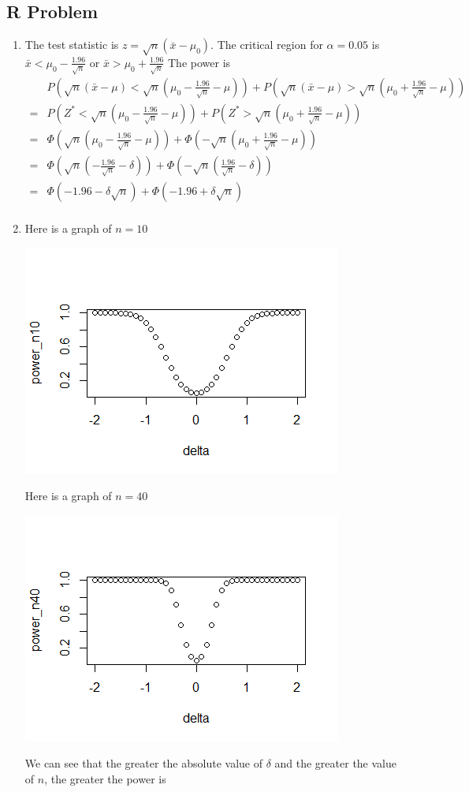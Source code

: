 \documentclass{article}
\begin{document}
\subsection*{R Problem}
\begin{enumerate}
	\item The test statistic is $z = \sqrt{n}(\bar{x} - \mu_0)$.
	The critical region for $\alpha = 0.05$ is 
	$\bar{x} < \mu_0-\frac{1.96}{\sqrt{n}}$ or $\bar{x} > \mu_0+\frac{1.96}{\sqrt{n}}$
	The power is 
	\begin{align*}
		 & P(\sqrt{n}(\bar{x} - \mu) < \sqrt{n}(\mu_0-\frac{1.96}{\sqrt{n}} - \mu)) + P(\sqrt{n}(\bar{x} - \mu) > \sqrt{n}(\mu_0+\frac{1.96}{\sqrt{n}}-\mu)) \\
		=& P(Z^* < \sqrt{n}(\mu_0-\frac{1.96}{\sqrt{n}} - \mu)) +P(Z^* > \sqrt{n}(\mu_0+\frac{1.96}{\sqrt{n}}-\mu)) \\
		=& \Phi(\sqrt{n}(\mu_0-\frac{1.96}{\sqrt{n}}-\mu)) + \Phi(-\sqrt{n}(\mu_0+\frac{1.96}{\sqrt{n}}-\mu)) \\
		=& \Phi(\sqrt{n}(-\frac{1.96}{\sqrt{n}}-\delta)) + \Phi(-\sqrt{n}(\frac{1.96}{\sqrt{n}}-\delta)) \\
		=& \Phi(-1.96-\delta\sqrt{n}) + \Phi(-1.96+\delta\sqrt{n}) \\
	\end{align*}
	\item Here is a graph of $n=10$ 
	
	\includegraphics*[scale=1.2]{hw7n10.png} 
	\newpage

	Here is a graph of $n=40$

	\includegraphics*[scale=1.2]{hw7n40.png}

	We can see that the greater the absolute value of $\delta$ and 
	the greater the value of $n$, the greater the power is
\end{enumerate}
\end{document}
